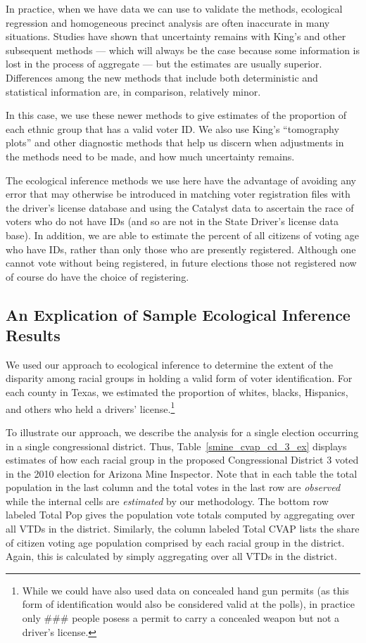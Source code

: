 \documentclass[12pt]{article}
\begin{document}
In practice, when we have data we can use to validate the methods,
ecological regression and homogeneous precinct analysis are often
inaccurate in many situations. Studies have shown that uncertainty
remains with King's and other subsequent methods --- which will always
be the case because some information is lost in the process of
aggregate --- but the estimates are usually superior. Differences
among the new methods that include both deterministic and statistical
information are, in comparison, relatively minor.

In this case, we use these newer methods to give estimates of the
proportion of each ethnic group that has a valid voter ID.  We also
use King's ``tomography plots'' and other diagnostic methods that help
us discern when adjustments in the methods need to be made, and how
much uncertainty remains.

The ecological inference methods we use here have the advantage of
avoiding any error that may otherwise be introduced in matching voter
registration files with the driver's license database and using the
Catalyst data to ascertain the race of voters who do not have IDs (and
so are not in the State Driver's license data base).  In addition, we
are able to estimate the percent of all citizens of voting age who
have IDs, rather than only those who are presently registered.
Although one cannot vote without being registered, in future elections
those not registered now of course do have the choice of registering.

\subsection{An Explication of Sample Ecological Inference Results}

We used our approach to ecological inference to determine the extent
of the disparity among racial groups in holding a valid form of voter identification. For each
county in Texas, we estimated the proportion of whites, blacks, Hispanics,
and others who held a drivers' license.\footnote{While we could have also used data on concealed hand gun permits
(as this form of identification would also be considered valid at the polls), in practice only ### people posess a
permit to carry a concealed weapon but not a driver's license.}

To illustrate our approach, we describe the analysis for a single election occurring in a single congressional
district.  Thus, Table~\ref{smine_cvap_cd_3_ex} displays estimates of
how each racial group in the proposed Congressional District 3 voted
in the 2010 election for Arizona Mine Inspector. Note that in each
table the total population in the last column and the total votes in
the last row are {\it observed} while the internal cells are {\it estimated} 
by our methodology. The bottom row labeled Total Pop
gives the population vote totals computed by aggregating over all VTDs
in the district.  Similarly, the column labeled Total CVAP lists the
share of citizen voting age population comprised by each racial group
in the district.  Again, this is calculated by simply aggregating over
all VTDs in the district.
\end{document}

